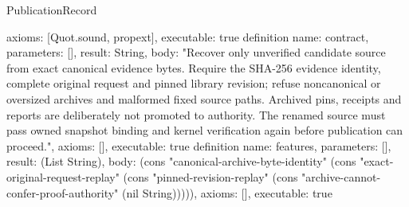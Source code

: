 \begin{lexlean}{PublicationRecord}
\begin{semanticmodule}
{ axioms: [Quot.sound, propext],
 executable: true
}
definition{
 name: contract,
 parameters: [],
 result: String,
 body: "Recover only unverified candidate source from exact canonical evidence bytes. Require the SHA-256 evidence identity, complete original request and pinned library revision; refuse noncanonical or oversized archives and malformed fixed source paths. Archived pins, receipts and reports are deliberately not promoted to authority. The renamed source must pass owned snapshot binding and kernel verification again before publication can proceed.",
 axioms: [],
 executable: true
}
definition{
 name: features,
 parameters: [],
 result: (List String),
 body: (cons "canonical-archive-byte-identity" (cons "exact-original-request-replay" (cons "pinned-revision-replay" (cons "archive-cannot-confer-proof-authority" (nil String))))),
 axioms: [],
 executable: true
}
\end{semanticmodule}
\end{lexlean}

